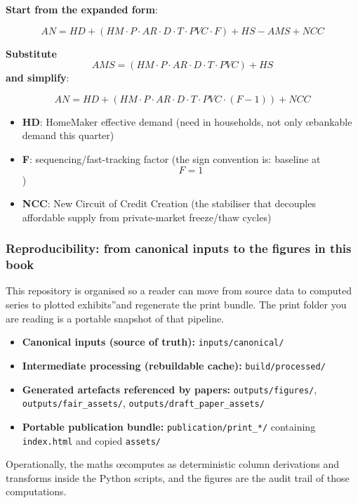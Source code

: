 \documentclass[
]{article}
\providecommand{\tightlist}{%
  \setlength{\itemsep}{0pt}\setlength{\parskip}{0pt}}
\begin{document}
\textbf{Start from the expanded form}:

\[AN = HD + (HM \cdot P \cdot AR \cdot D \cdot T \cdot PVC \cdot F) + HS - AMS + NCC\]

\textbf{Substitute}
\[AMS = (HM \cdot P \cdot AR \cdot D \cdot T \cdot PVC) + HS\]
\textbf{and simplify}:

\[AN = HD + (HM \cdot P \cdot AR \cdot D \cdot T \cdot PVC \cdot (F - 1)) + NCC\]

\begin{itemize}
\tightlist
\item
  \textbf{HD}: HomeMaker effective demand (need in households, not only
  œbankable demand this quarter)
\item
  \textbf{F}: sequencing/fast-tracking factor (the sign convention is:
  baseline at \[F=1\])
\item
  \textbf{NCC}: New Circuit of Credit Creation (the stabiliser that
  decouples affordable supply from private-market freeze/thaw cycles)
\end{itemize}

\protect{}\label{repo-structure}
\subsubsection{Reproducibility: from canonical inputs to the figures in
this
book}\label{reproducibility-from-canonical-inputs-to-the-figures-in-this-book}

This repository is organised so a reader can move from source data to
computed series to plotted exhibits''and regenerate the print bundle.
The print folder you are reading is a portable snapshot of that
pipeline.

\begin{itemize}
\tightlist
\item
  \textbf{Canonical inputs (source of truth):}
  \texttt{inputs/canonical/}
\item
  \textbf{Intermediate processing (rebuildable cache):}
  \texttt{build/processed/}
\item
  \textbf{Generated artefacts referenced by papers:}
  \texttt{outputs/figures/}, \texttt{outputs/fair\_assets/},
  \texttt{outputs/draft\_paper\_assets/}
\item
  \textbf{Portable publication bundle:} \texttt{publication/print\_*/}
  containing \texttt{index.html} and copied \texttt{assets/}
\end{itemize}

Operationally, the maths œcomputes as deterministic column derivations
and transforms inside the Python scripts, and the figures are the audit
trail of those computations.
\end{document}
